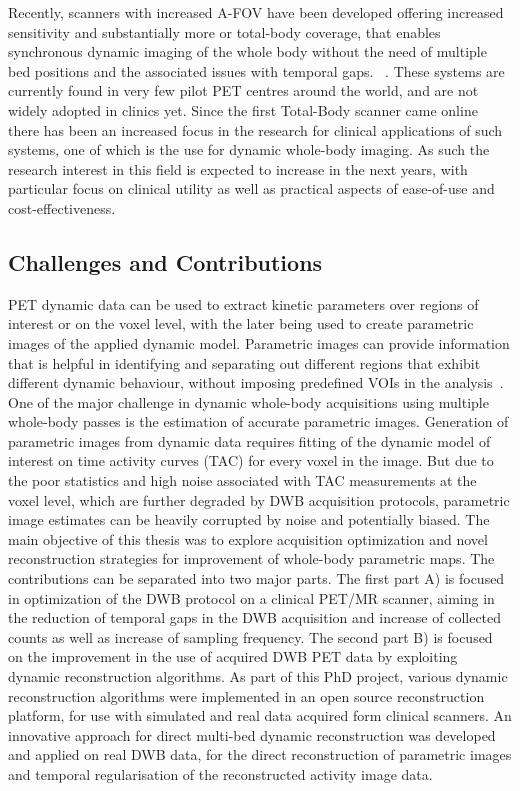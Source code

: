 Recently, scanners with increased A-FOV have been developed offering increased sensitivity and substantially more or total-body coverage, that enables synchronous dynamic imaging of the whole body without the need of multiple bed positions and the associated issues with temporal gaps. ~\cite{Karp2020,Siegel2020, Cherry2018}.
These systems are currently found in very few pilot PET centres around the world, and are not widely adopted in clinics yet. Since the first Total-Body scanner came online there has been an increased focus in the research for clinical applications of such systems, one of which is the use for dynamic whole-body imaging. As such the research interest in this field is expected to increase in the next years, with particular focus on clinical utility as well as practical aspects of ease-of-use and cost-effectiveness.

\subsection*{Challenges and Contributions}
PET dynamic data can be used to extract kinetic parameters over regions of interest or on the voxel level, with the later being used to create parametric images of the applied dynamic model.
Parametric images can provide information that is helpful in identifying and separating out different regions that exhibit different dynamic behaviour, without imposing predefined VOIs in the analysis~\cite{Gallezot2019}.  
One of the major challenge in dynamic whole-body acquisitions using multiple whole-body passes is the estimation of accurate parametric images. Generation of parametric images from dynamic data requires fitting of the dynamic model of interest on time activity curves (TAC) for every voxel in the image. But due to the poor statistics and high noise associated with TAC measurements at the voxel level, which are further degraded by DWB acquisition protocols, parametric image estimates can be heavily corrupted by noise and potentially biased. 
The main objective of this thesis was to explore acquisition optimization and novel reconstruction strategies for improvement of whole-body parametric maps. 
The contributions can be separated into two major parts. The first part A) is focused in optimization of the DWB protocol on a clinical PET/MR scanner, aiming in the reduction of temporal gaps in the DWB acquisition and increase of collected counts as well as increase of sampling frequency. The second part B) is focused on the improvement in the use of acquired DWB PET data by exploiting dynamic reconstruction algorithms. As part of this PhD project, various dynamic reconstruction algorithms were implemented in an open source reconstruction platform, for use with simulated and real data acquired form clinical scanners. An innovative approach for direct multi-bed dynamic reconstruction was developed and applied on real DWB data, for the direct reconstruction of parametric images and temporal regularisation of the reconstructed activity image data.

